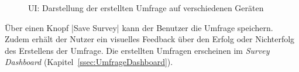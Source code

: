\begin{figure}[!htb]
	\caption[\acl{UI}: Darstellung der erstellten Umfrage auf verschiedenen Geräten]{\label{fig:SurveyCreatorViewImplement}\acl{UI}: Darstellung der erstellten Umfrage auf verschiedenen Geräten \\ \quelleScreenshot}
\end{figure}

Über einen Knopf \jinline|Save Survey| kann der Benutzer die Umfrage speichern.
Zudem erhält der Nutzer ein visuelles Feedback über den Erfolg oder Nichterfolg des Erstellens der Umfrage.
Die erstellten Umfragen erscheinen im \emph{Survey Dashboard} (Kapitel~\vref{ssec:UmfrageDashboard}).
